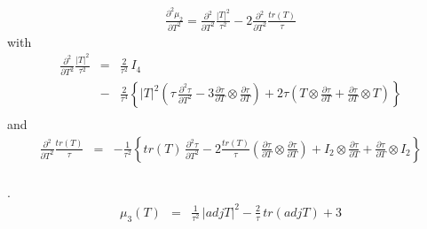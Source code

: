 \documentclass{report}
\begin{document}
\begin{eqnarray}
\frac{\partial^2 \mu_2}{\partial T^2} = \frac{\partial^2}{\partial T^2} \frac{|T|^2}{\tau^2} - 2 \frac{\partial^2}{\partial T^2} \frac{tr(T)}{\tau}
\end{eqnarray}
with
\begin{eqnarray}
 \frac{\partial^2}{\partial T^2} \frac{|T|^2}{\tau^2} & = & \frac{2}{\tau^2} \, I_{4} \nonumber \\
 & - & \frac{2}{\tau^4} \left\{ |T|^2 \left( \tau \, \frac{\partial^2 \tau}{\partial T^2} - 3 \frac{\partial \tau}{\partial T} \otimes \frac{\partial \tau}{\partial T}  \right) + 2 \tau \left( T \otimes \frac{\partial \tau}{\partial T} + \frac{\partial \tau}{\partial T} \otimes T \right) \right\} \nonumber \\
\end{eqnarray}
and 
\begin{eqnarray}
 \frac{\partial^2}{\partial T^2} \frac{tr(T)}{\tau} & = & -\frac{1}{\tau^2} \left\{ tr(T) \, \frac{\partial^2 \tau}{\partial T^2} -2 \frac{tr(T)}{\tau} \left( \frac{\partial \tau}{\partial T} \otimes \frac{\partial \tau}{\partial T} \right) + I_2 \otimes \frac{\partial \tau}{\partial T} + \frac{\partial \tau}{\partial T} \otimes I_2 \right\} \nonumber \\
\end{eqnarray}

. \newline
\begin{eqnarray}
\mu_3 (T) & = & \frac{1}{\tau^2} \, |adj T|^2 - \frac{2}{\tau} \, tr(adj T) + 3
\end{eqnarray}
\end{document}
